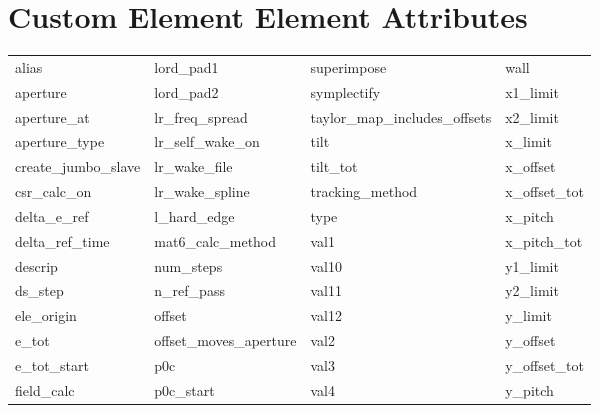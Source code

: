  \section{Custom Element Element Attributes}
 \label{s:list.custom}
 
 \begin{tabular}{llll} \toprule
alias                       & lord_pad1                   & superimpose                 & wall                        \\
aperture                    & lord_pad2                   & symplectify                 & x1_limit                    \\
aperture_at                 & lr_freq_spread              & taylor_map_includes_offsets & x2_limit                    \\
aperture_type               & lr_self_wake_on             & tilt                        & x_limit                     \\
create_jumbo_slave          & lr_wake_file                & tilt_tot                    & x_offset                    \\
csr_calc_on                 & lr_wake_spline              & tracking_method             & x_offset_tot                \\
delta_e_ref                 & l_hard_edge                 & type                        & x_pitch                     \\
delta_ref_time              & mat6_calc_method            & val1                        & x_pitch_tot                 \\
descrip                     & num_steps                   & val10                       & y1_limit                    \\
ds_step                     & n_ref_pass                  & val11                       & y2_limit                    \\
ele_origin                  & offset                      & val12                       & y_limit                     \\
e_tot                       & offset_moves_aperture       & val2                        & y_offset                    \\
e_tot_start                 & p0c                         & val3                        & y_offset_tot                \\
field_calc                  & p0c_start                   & val4                        & y_pitch                     \\

\end{tabular}
